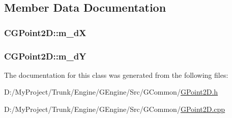 \subsection{Member Data Documentation}
\hypertarget{class_c_g_point2_d_a9b0af0e6a6034eb284242443db4d7c01}{}
\subsubsection[{m\+\_\+d\+X}]{ C\+G\+Point2\+D\+::m\+\_\+d\+X\hspace{0.3cm}{\ttfamily [protected]}}\label{class_c_g_point2_d_a9b0af0e6a6034eb284242443db4d7c01}
\hypertarget{class_c_g_point2_d_a7701a5b97efab581f7ae8a30d43ff536}{}
\subsubsection[{m\+\_\+d\+Y}]{ C\+G\+Point2\+D\+::m\+\_\+d\+Y\hspace{0.3cm}{\ttfamily [protected]}}\label{class_c_g_point2_d_a7701a5b97efab581f7ae8a30d43ff536}


The documentation for this class was generated from the following files\+:\begin{DoxyCompactItemize}
\item 
D\+:/\+My\+Project/\+Trunk/\+Engine/\+G\+Engine/\+Src/\+G\+Common/\hyperlink{_g_point2_d_8h}{G\+Point2\+D.\+h}\item 
D\+:/\+My\+Project/\+Trunk/\+Engine/\+G\+Engine/\+Src/\+G\+Common/\hyperlink{_g_point2_d_8cpp}{G\+Point2\+D.\+cpp}\end{DoxyCompactItemize}
